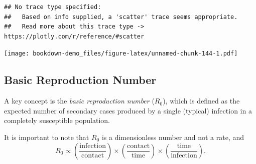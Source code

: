 \documentclass[]{book}
\newenvironment{Shaded}{\begin{snugshade}}{\end{snugshade}}
\newcommand{\KeywordTok}[1]{\textcolor[rgb]{0.13,0.29,0.53}{\textbf{#1}}}
\newcommand{\DataTypeTok}[1]{\textcolor[rgb]{0.13,0.29,0.53}{#1}}
\newcommand{\StringTok}[1]{\textcolor[rgb]{0.31,0.60,0.02}{#1}}
\newcommand{\CommentTok}[1]{\textcolor[rgb]{0.56,0.35,0.01}{\textit{#1}}}
\newcommand{\OperatorTok}[1]{\textcolor[rgb]{0.81,0.36,0.00}{\textbf{#1}}}
\newcommand{\NormalTok}[1]{#1}
\begin{document}
\begin{Shaded}
\end{Shaded}

\begin{verbatim}
## No trace type specified:
##   Based on info supplied, a 'scatter' trace seems appropriate.
##   Read more about this trace type -> https://plotly.com/r/reference/#scatter
\end{verbatim}

\texttt{[image: bookdown-demo\_files/figure-latex/unnamed-chunk-144-1.pdf]}

\subsection{Basic Reproduction Number}\label{basic-reproduction-number}

A key concept is the \emph{basic reproduction number} (\(R_0\)), which
is defined as the expected number of secondary cases produced by a
single (typical) infection in a completely susceptible population.

It is important to note that \(R_0\) is a dimensionless number and not a
rate, and \[
  R_0 \propto \left(\frac{\mathrm{infection}}{\mathrm{contact}} \right) \times \left(\frac{\mathrm{contact}}{\mathrm{time}}\right) \times \left(\frac{\mathrm{time}}{\mathrm{infection}}\right).
\]
\end{document}
